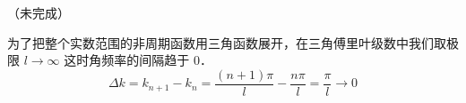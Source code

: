 
（未完成）

为了把整个实数范围的非周期函数用三角函数展开，在三角傅里叶级数中我们取极限 $l\to\infty$ 这时角频率的间隔趋于 0．
\begin{equation}
\Delta k = k_{n+1} - k_n = \frac{(n+1)\pi}{l} - \frac{n\pi}{l} = \frac{\pi}{l} \to 0
\end{equation}
